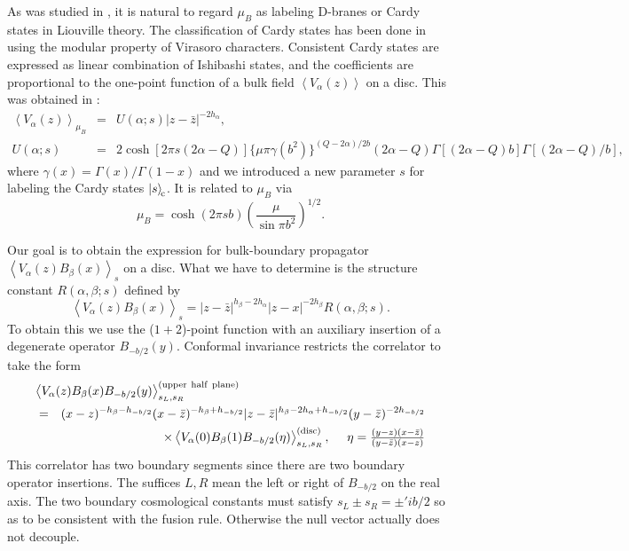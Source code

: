 \documentclass[a4paper,11pt]{article}
\newcommand{\vev}[1]{\left<{#1}\right>}
\newcommand{\cket}[1]{\left|{#1}\right>_{\rm \!c}}
\newcommand{\tfrac}[2]{{\textstyle\frac{#1}{#2}}}
\begin{document}
   As was studied in \cite{FZZ,ZZ}, it is natural to regard $\mu_B$
 as labeling D-branes or Cardy states in Liouville theory.
 The classification of Cardy states has been done in \cite{ZZ} using
 the modular property of Virasoro characters.
 Consistent Cardy states are expressed as linear combination of
 Ishibashi states, and the coefficients are proportional to
 the one-point function of a bulk field $\vev{V_\alpha(z)}$ on a disc.
 This was obtained in \cite{FZZ}:
\begin{eqnarray}
  \vev{V_\alpha(z)}_{\mu_B} &=& U(\alpha;s)|z-\bar{z}|^{-2h_\alpha},
 \nonumber \\
  U(\alpha;s) &=& 2 \cosh\left[2\pi s(2\alpha-Q)\right]
  \{\mu\pi\gamma(b^2)\}^{(Q-2\alpha)/2b}
  (2\alpha-Q)\Gamma[(2\alpha-Q)b]\Gamma[(2\alpha-Q)/b],
\label{U}
\end{eqnarray}
 where $\gamma(x)=\Gamma(x)/\Gamma(1-x)$ and we introduced
 a new parameter $s$ for labeling the Cardy states $\cket{s}$.
 It is related to $\mu_B$ via
\begin{equation}
  \mu_B = \cosh(2\pi sb)\left(\frac{\mu}{\sin\pi b^2}\right)^{1/2}.
\label{bcc-p}
\end{equation}

   Our goal is to obtain the expression for bulk-boundary propagator
 $\vev{V_\alpha(z)B_\beta(x)}_s$ on a disc.
 What we have to determine is the structure constant
 $R(\alpha,\beta;s)$ defined by
\begin{equation}
  \vev{V_\alpha(z)B_\beta(x)}_{s}=
  |z-\bar{z}|^{h_\beta-2h_\alpha}|z-x|^{-2h_\beta}R(\alpha,\beta;s).
\end{equation}
 To obtain this we use the ($1+2$)-point function
 with an auxiliary insertion of a degenerate operator $B_{-b/2}(y)$.
 Conformal invariance restricts the correlator to take the form
\begin{eqnarray}
\lefteqn{
  \vev{V_\alpha(z)B_\beta(x)B_{-b/2}(y)}^{\rm (upper~half~plane)}_{s_L,s_R}
} \nonumber \\
 &=& (x-z)^{-h_\beta-h_{-b/2}}(x-\bar{z})^{-h_\beta+h_{-b/2}}
     |z-\bar{z}|^{h_\beta-2h_\alpha+h_{-b/2}}(y-\bar{z})^{-2h_{-b/2}}
  \nonumber \\
 & &\times \vev{V_\alpha(0)B_\beta(1)B_{-b/2}(\eta)}^{\rm (disc)}_{s_L,s_R},
  ~~~~\eta=\tfrac{(y-z)(x-\bar{z})}{(y-\bar{z})(x-z)}
\end{eqnarray}
 This correlator has two boundary segments since there are two
 boundary operator insertions.
 The suffices $L,R$ mean the left or right of $B_{-b/2}$ on the real axis.
 The two boundary cosmological constants must satisfy
 $s_L\pm s_R = \pm' ib/2$ so as to be consistent with
 the fusion rule\cite{ZZ}.
 Otherwise the null vector actually does not decouple.
\end{document}
